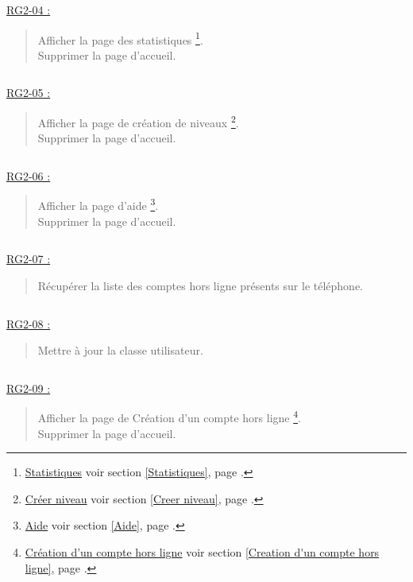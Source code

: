 \documentclass{report}
\begin{document}
		$\,$

		\underline{RG2-04 :}
			\begin{quote}
				Afficher la page des statistiques%
					\footnote[5]{
						\hyperlink{Statistiques}{Statistiques}
						\og voir section \ref{Statistiques}, page \pageref{Statistiques}.\fg
					}.\\
				Supprimer la page d'accueil\footnotemark[2].
			\end{quote}

		$\,$

		\underline{RG2-05 :}
			\begin{quote}
				Afficher la page de création de niveaux%
					\footnote[6]{
						\hyperlink{Creer niveau}{Créer niveau}
						\og voir section \ref{Creer niveau}, page \pageref{Creer niveau}.\fg
					}.\\
				Supprimer la page d'accueil\footnotemark[2].		
			\end{quote}

		$\,$

		\underline{RG2-06 :}
			\begin{quote}
				Afficher la page d'aide%
					\footnote[7]{
						\hyperlink{Aide}{Aide}
						\og voir section \ref{Aide}, page \pageref{Aide}.\fg
					}.\\
				Supprimer la page d'accueil\footnotemark[2].		
			\end{quote}
		
		$\,$	
			
		\underline{RG2-07 :}
			\begin{quote}
				Récupérer la liste des comptes hors ligne présents sur le téléphone.
			\end{quote}

		$\,$

		\underline{RG2-08 :}
			\begin{quote}
				Mettre à jour la classe utilisateur.
			\end{quote}

		$\,$

		\underline{RG2-09 :}
			\begin{quote}
				Afficher la page de Création d'un compte hors ligne%
					\footnote[8]{
						\hyperlink{profil}{Création d'un compte hors ligne}
						\og voir section \ref{Creation d'un compte hors ligne}, page \pageref{Creation d'un compte hors ligne}.\fg
					}.\\
				Supprimer la page d'accueil\footnotemark[2].
			\end{quote}
\end{document}
